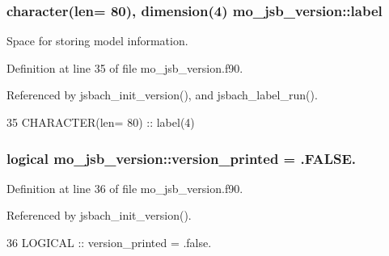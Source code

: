 \subsubsection[{label}]{\setlength{\rightskip}{0pt plus 5cm}character(len= 80), dimension(4) mo\+\_\+jsb\+\_\+version\+::label}\label{namespacemo__jsb__version_a65699e250219835c1bcfd563841df67b}


Space for storing model information. 



Definition at line 35 of file mo\+\_\+jsb\+\_\+version.\+f90.



Referenced by jsbach\+\_\+init\+\_\+version(), and jsbach\+\_\+label\+\_\+run().


\begin{DoxyCode}
35   \textcolor{keywordtype}{CHARACTER(len= 80)} :: label(4)
\end{DoxyCode}
\hypertarget{namespacemo__jsb__version_af0c80a14a6251abea4b1cf5462dedc25}{}
\subsubsection[{version\+\_\+printed}]{\setlength{\rightskip}{0pt plus 5cm}logical mo\+\_\+jsb\+\_\+version\+::version\+\_\+printed = .F\+A\+L\+S\+E.}\label{namespacemo__jsb__version_af0c80a14a6251abea4b1cf5462dedc25}


Definition at line 36 of file mo\+\_\+jsb\+\_\+version.\+f90.



Referenced by jsbach\+\_\+init\+\_\+version().


\begin{DoxyCode}
36   \textcolor{keywordtype}{LOGICAL}            :: version\_printed = .false.
\end{DoxyCode}
